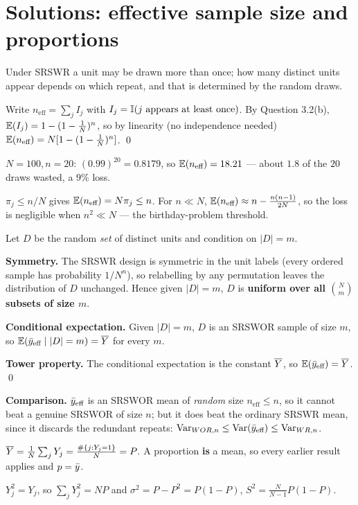 \section{Solutions: effective sample size and proportions}
\setcounter{qq}{0}

 Under SRSWR a unit may be drawn more than once; how many distinct units appear depends on
which repeat, and that is determined by the random draws.

 Write $n_{\text{eff}}=\sum_jI_j$ with $I_j=\mathbb{I}(j\text{ appears at least once})$. By
Question 3.2(b), $\mathbb{E}(I_j)=1-(1-\frac1N)^n$, so by linearity (no independence needed)
$\mathbb{E}(n_{\text{eff}})=N[1-(1-\frac1N)^n]$. \qed

 $N=100,n=20$: $(0.99)^{20}=0.8179$, so $\mathbb{E}(n_{\text{eff}})=18.21$ --- about $1.8$ of the
$20$ draws wasted, a $9\%$ loss.

 $\pi_j\le n/N$ gives $\mathbb{E}(n_{\text{eff}})=N\pi_j\le n$. For $n\ll N$,
$\mathbb{E}(n_{\text{eff}})\approx n-\frac{n(n-1)}{2N}$, so the loss is negligible when $n^2\ll N$ --- the
birthday-problem threshold.

\sol Let $D$ be the random \emph{set} of distinct units and condition on $|D|=m$.

\textbf{Symmetry.} The SRSWR design is symmetric in the unit labels (every ordered sample has
probability $1/N^n$), so relabelling by any permutation leaves the distribution of $D$ unchanged.
Hence given $|D|=m$, $D$ is \textbf{uniform over all $\binom Nm$ subsets of size $m$}.

\textbf{Conditional expectation.} Given $|D|=m$, $D$ is an SRSWOR sample of size $m$, so
$\mathbb{E}(\bar{y}_{\text{eff}}\mid|D|=m)=\overline{Y}$ for every $m$.

\textbf{Tower property.} The conditional expectation is the constant $\overline{Y}$, so
$\mathbb{E}(\bar{y}_{\text{eff}})=\overline{Y}$. \qed

\textbf{Comparison.} $\bar{y}_{\text{eff}}$ is an SRSWOR mean of \emph{random} size
$n_{\text{eff}}\le n$, so it cannot beat a genuine SRSWOR of size $n$; but it does beat the
ordinary SRSWR mean, since it discards the redundant repeats:
$\operatorname{Var}_{WOR,n}\le\operatorname{Var}(\bar{y}_{\text{eff}})\le\operatorname{Var}_{WR,n}$.

 $\overline{Y}=\frac1N\sum_jY_j=\frac{\#\{j:Y_j=1\}}{N}=P$. A proportion \textbf{is} a mean, so
every earlier result applies and $p=\bar{y}$.

 $Y_j^2=Y_j$, so $\sum_jY_j^2=NP$ and
$\sigma^2=P-P^2=P(1-P)$, $S^2=\frac{N}{N-1}P(1-P)$.

